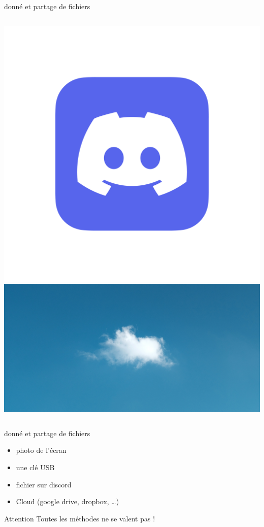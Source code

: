 \documentclass[usenames,dvipsnames]{beamer}
\begin{document}
\begin{frame}[fragile]{donné et partage de fichiers}
\begin{columns}
\begin{column}{0.5\linewidth}
\begin{overprint}
				\includegraphics[width=\linewidth]{Im/discord.png}
				\onslide<4>\includegraphics[width=\linewidth]{Im/cumulus.jpg}
			\end{overprint}
		\end{column}
	\end{columns}
\end{frame}

\begin{frame}[fragile]{donné et partage de fichiers}
	\begin{itemize}
		\item photo de l'écran
		\item une clé USB
		\item fichier sur discord
		\item Cloud (google drive, dropbox, \dots)
	\end{itemize}
	\begin{alertblock}{Attention}
		Toutes les méthodes ne se valent pas !
	\end{alertblock}
\end{frame}
\end{document}
